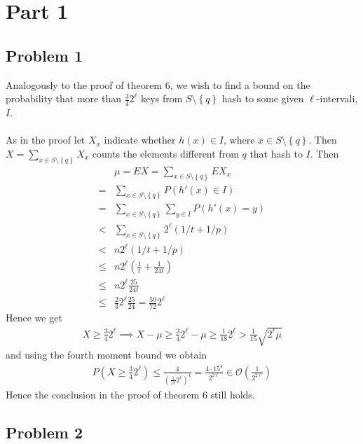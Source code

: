 \section*{Part 1}
\subsection*{Problem 1}
Analogously to the proof of theorem 6,
we wish to find a bound on the probability that more than $\frac{3}{4}2^{\ell}$ 
keys from $S \setminus \left\{ q \right\}$ hash to some given $\ell$-intervali, $I$. \\ \\
As in the proof let $X_x$ indicate whether $h(x) \in I$, where $x \in S \setminus \left\{ q \right\}$. 
Then $X=\sum_{x \in S \setminus \left\{ q \right\}}^{}X_x$ counts the elements different from $q$ that hash to $I$. Then
\begin{align*}
	&\mu=EX=\sum_{x \in S \setminus \left\{ q \right\}}^{}EX_x \\
	=&\sum_{x \in S \setminus \left\{ q \right\}} P(h'(x)  \in I) \\
	=&\sum_{x \in S \setminus \left\{ q \right\}} \sum_{y \in I}^{}P\left( h'(x) =y \right) \\
	<&\sum_{x \in S \setminus \left\{ q \right\}}2^{\ell}\left( 1/t+1/p \right) \\
	<& n 2^{\ell}\left( 1/t+1/p \right) \\
	\leq & n2^{\ell} \left( \frac{1}{t}+\frac{1}{24t} \right) \\
	\leq & n 2^{\ell} \frac{25}{24t} \\
	\leq & \frac{2}{3}2^{\ell} \frac{25}{24} = \frac{50}{72}2^{\ell}
\end{align*}
Hence we get
\begin{align*}
	X \geq \frac{3}{4}2^{\ell} \implies X-\mu \geq \frac{3}{4}2^{\ell}-\mu \geq \frac{1}{18}2^{\ell} >\frac{1}{15}\sqrt{2^{\ell}\mu}
\end{align*}
and using the fourth moment bound we obtain
\begin{align*}
	P\left( X \geq \frac{3}{4}2^{\ell} \right) \leq \frac{4}{\left( \frac{1}{15}2^{\ell}\right)^4} 
	= \frac{4 \cdot 15^4}{2^{2\ell}} \in \mathcal{O}\left( \frac{1}{2^{2 \ell}} \right)
\end{align*}
Hence the conclusion in the proof of theorem 6 still holds.

\subsection*{Problem 2}

